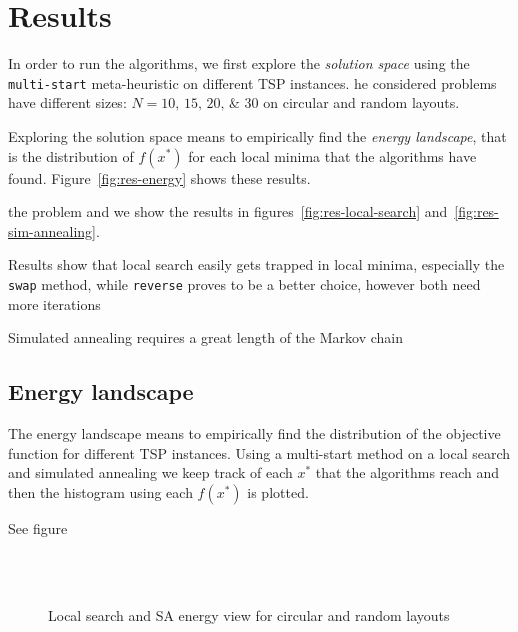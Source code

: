 \section{Results}\label{subsc:res}

In order to run the algorithms, we first explore the \emph{solution space} using the \texttt{multi-start} meta-heuristic on different TSP instances. he considered problems have different sizes: $N=\numlist{10;15;20;30}$ on circular and random layouts.

Exploring the solution space means to empirically find the \emph{energy landscape}, that is the distribution of $f(x^\ast)$ for each local minima that the algorithms have found. Figure~\vref{fig:res-energy} shows these results.






the problem and we show the results in figures~\ref{fig:res-local-search} and~\vref{fig:res-sim-annealing}.

Results show that local search easily gets trapped in local minima, especially the \texttt{swap} method, while \texttt{reverse} proves to be a better choice, however both need more iterations

Simulated annealing requires a great length of the Markov chain


\subsection{Energy landscape}\label{subsc:energy-land}

The energy landscape means to empirically find the distribution of the objective function for different TSP instances. Using a multi-start method on a local search and simulated annealing we keep track of each $x^\ast$ that the algorithms reach and then the histogram using each $f(x^\ast)$ is plotted.

See figure



\begin{figure}
\centering
{} \,
 \\
 \,
\caption{Local search and SA energy view for circular and random layouts}
\label{fig:res-energy}
\end{figure}



